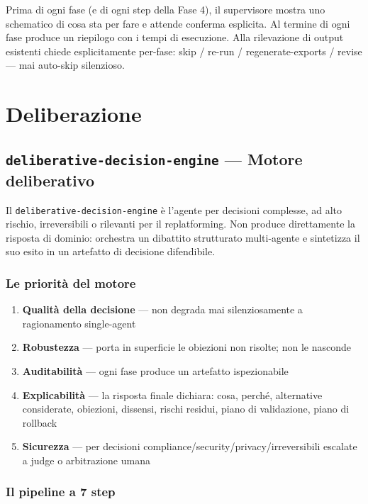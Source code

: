 \documentclass[12pt,a4paper,twoside]{book}
\begin{document}
Prima di ogni fase (e di ogni step della Fase 4), il supervisore mostra uno schematico di cosa sta per fare e attende conferma esplicita. Al termine di ogni fase produce un riepilogo con i tempi di esecuzione. Alla rilevazione di output esistenti chiede esplicitamente per-fase: skip / re-run / regenerate-exports / revise — mai auto-skip silenzioso.

\chapter{Deliberazione}

\section{\texttt{deliberative-decision-engine} — Motore deliberativo}

Il \texttt{deliberative-decision-engine} è l'agente per decisioni complesse, ad alto rischio, irreversibili o rilevanti per il replatforming. Non produce direttamente la risposta di dominio: orchestra un dibattito strutturato multi-agente e sintetizza il suo esito in un artefatto di decisione difendibile.

\subsection{Le priorità del motore}

\begin{enumerate}
  \item \textbf{Qualità della decisione} — non degrada mai silenziosamente a ragionamento single-agent
  \item \textbf{Robustezza} — porta in superficie le obiezioni non risolte; non le nasconde
  \item \textbf{Auditabilità} — ogni fase produce un artefatto ispezionabile
  \item \textbf{Explicabilità} — la risposta finale dichiara: cosa, perché, alternative considerate, obiezioni, dissensi, rischi residui, piano di validazione, piano di rollback
  \item \textbf{Sicurezza} — per decisioni compliance/security/privacy/irreversibili escalate a judge o arbitrazione umana
\end{enumerate}

\subsection{Il pipeline a 7 step}
\end{document}
